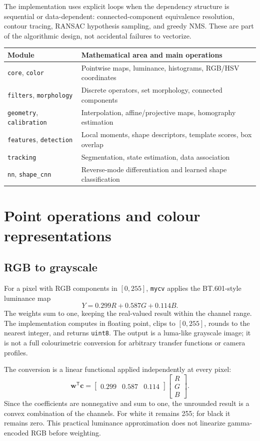 \documentclass[11pt,a4paper]{article}
\newcommand{\1}{\mathbf{1}}
\newcommand{\mycv}{\texttt{mycv}}
\begin{document}
The implementation uses explicit loops when the dependency structure is
sequential or data-dependent: connected-component equivalence resolution,
contour tracing, RANSAC hypothesis sampling, and greedy NMS. These are part of
the algorithmic design, not accidental failures to vectorize.

\begin{center}
\begin{tabularx}{\textwidth}{@{}l X@{}}
\toprule
Module & Mathematical area and main operations \\
\midrule
\texttt{core}, \texttt{color} & Pointwise maps, luminance, histograms, RGB/HSV coordinates \\
\texttt{filters}, \texttt{morphology} & Discrete operators, set morphology, connected components \\
\texttt{geometry}, \texttt{calibration} & Interpolation, affine/projective maps, homography estimation \\
\texttt{features}, \texttt{detection} & Local moments, shape descriptors, template scores, box overlap \\
\texttt{tracking} & Segmentation, state estimation, data association \\
\texttt{nn}, \texttt{shape\_cnn} & Reverse-mode differentiation and learned shape classification \\
\bottomrule
\end{tabularx}
\end{center}

\section{Point operations and colour representations}

\subsection{RGB to grayscale}

For a pixel with RGB components in $[0,255]$, \mycv{} applies the BT.601-style
luminance map
\[
  Y=0.299R+0.587G+0.114B.
\]
The weights sum to one, keeping the real-valued result within the channel range.
The implementation computes in floating point, clips to $[0,255]$, rounds to
the nearest integer, and returns \texttt{uint8}. The output is a luma-like grayscale
image; it is not a full colourimetric conversion for arbitrary transfer
functions or camera profiles.

The conversion is a linear functional applied independently at every pixel:
\[
 \bm{w}^{\mathsf T}\bm{c}
 =\begin{bmatrix}0.299&0.587&0.114\end{bmatrix}
  \begin{bmatrix}R\\G\\B\end{bmatrix}.
\]
Since the coefficients are nonnegative and sum to one, the unrounded result is
a convex combination of the channels. For white it remains 255; for black it
remains zero. This practical luminance approximation does not linearize
gamma-encoded RGB before weighting.
\end{document}
